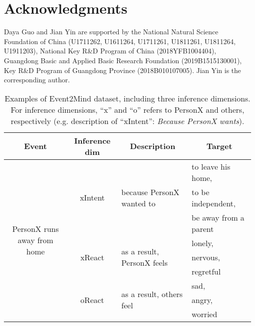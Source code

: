 \documentclass[11pt,a4paper]{article}
\begin{document}
\section*{Acknowledgments}
Daya Guo and Jian Yin are supported by the National Natural Science Foundation of China (U1711262, U1611264, U1711261, U1811261, U1811264, U1911203), National Key R\&D Program of China (2018YFB1004404), Guangdong Basic and Applied Basic Research Foundation (2019B1515130001), Key R\&D Program of Guangdong Province (2018B010107005). Jian Yin is the corresponding author.




\appendix




\begin{table*}[t]
	\begin{center}
		{\small
			\begin{tabular}{c|c|l|l} 
				\hline 
				Event&Inference dim &\multicolumn{1}{c|}{Description}& \multicolumn{1}{c}{Target} \\
				\hline
				\multirow{9}{*}{PersonX runs away from home}&\multirow{3}{*}{xIntent}&\multirow{3}{*}{because PersonX wanted to}&to leave his home,  \\
				~&~&~&to be independent,  \\
				~&~&~&be away from a parent \\
				\cline{2-4}
				~&\multirow{3}{*}{xReact}&\multirow{3}{*}{as a result, PersonX feels}&lonely,  \\
				~&~&~&nervous,  \\
				~&~&~&regretful \\
				\cline{2-4}
				~&\multirow{3}{*}{oReact}&\multirow{3}{*}{as a result, others feel}&sad,  \\
				~&~&~&angry, \\
				~&~&~&worried  \\
				\hline 
			\end{tabular}
		}
	\end{center}
	\caption{\label{table:Event2Mind} Examples of Event2Mind dataset, including three inference dimensions. For inference dimensions, ``x'' and ``o'' refers to PersonX and others, respectively (e.g. description of ``xIntent'': \textit{Because PersonX wants}). }
\end{table*}
\end{document}
